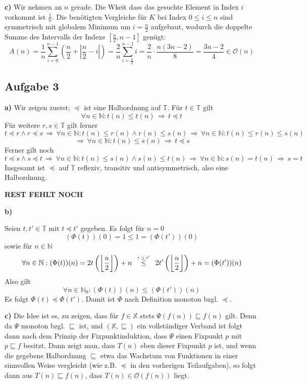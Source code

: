 \documentclass[a4paper,graphics,11pt]{article}
\newcommand{\aufgabe}[1]{\subsection*{Aufgabe #1}}
\newcommand{\up}[2]{\mathrel{\overset{\makebox[0pt]{\mbox{\normalfont\tiny #2}}}{#1}}}
\begin{document}
\textbf{c)} 
Wir nehmen an $n$ gerade. Die Wkeit dass das gesuchte Element in Index $i$ vorkommt ist $\frac{1}{n}$.
Die benötigten Vergleiche für $K$ bei Index $0\leq i \leq n$
sind symmetrisch mit globalem Minimum um $i = \frac{n}{2}$ aufgebaut, wodurch die doppelte Summe des
Intervalls der Indexe $[\frac{n}{2}, n-1]$ genügt:
$$
    A(n)
    = \frac{1}{n} \sum_{i=0}^{n-1}\left( \frac{n}{2} + \left|\frac{n}{2} -i\right|\right)
    = \frac{2}{n} \sum_{i=\frac{n}{2}}^{n-1} i
    = \frac{2}{n} \cdot \frac{n(3n-2)}{8}
    = \frac{3n-2}{4} \in \mathcal{O}(n)
$$

\newpage
\aufgabe{3}
\textbf{a)}
Wir zeigen zuerst; $\preceq$ ist eine Halbordnung auf $\mathbb{T}$.
Für $t \in \mathbb{T}$ gilt
$$
    \forall n \in \mathbb{N} : t(n) \leq t(n) \,\Longrightarrow\, t \preceq t
$$
Für weitere $r,s \in \mathbb{T}$ gilt ferner
$$
    t \preceq r \land r \preceq s
    \,\Longrightarrow\,
    \forall n \in \mathbb{N} : t(n) \leq r(n) \land r(n) \leq s(n)
    \,\Longrightarrow\, \forall n \in \mathbb{N} : t(n) \leq r(n) \leq s(n)
$$$$
    \,\Longrightarrow\, \forall n \in \mathbb{N} : t(n) \leq s(n)
    \,\Longrightarrow\, t \preceq s
$$
Ferner gilt noch
$$
    t \preceq s \land s \preceq t
    \,\Longrightarrow\, \forall n \in\mathbb{N} : t(n) \leq s(n) \land s(n) \leq t(n)
    \,\Longrightarrow\, \forall n \in\mathbb{N} : s(n) = t(n)
    \,\Longrightarrow\, s = t
$$
Insgesamt ist $\preceq$ auf $\mathbb{T}$ reflexiv, transitiv und antisymmetrisch, also eine Halbordnung.

\textbf{REST FEHLT NOCH}

\textbf{b)}

Seien $t, t' \in \mathbb{T}$ mit $t \preceq t'$ gegeben. Es folgt für $n = 0$
$$
    (\Phi(t))(0) = 1 \leq 1 = (\Phi(t'))(0)
$$
sowie für $n \in \mathbb{N}$
$$
    \forall n \in \mathbb{N}: (\Phi(t))(n)
    = 2t\left(\bigg\lfloor\frac{n}{2}\bigg\rfloor\right)+n
    \quad\up{\leq}{$t \preceq t'$}\quad
    2t'\left(\bigg\lfloor\frac{n}{2}\bigg\rfloor\right)+n
    = (\Phi(t'))(n)
$$
Also gilt
$$
    \forall n \in \mathbb{N}_0 : (\Phi(t))(n) \leq (\Phi(t'))(n)
$$
Es folgt $\Phi(t) \preceq \Phi(t')$. Damit ist $\Phi$ nach Definition monoton bzgl. $\preceq$.

\textbf{c)}
Die Idee ist es, zu zeigen, dass für $f \in \mathbb{X}$ stets $\Psi(f(n)) \sqsubseteq f(n)$ gilt.
Denn da $\Psi$ monoton bzgl. $\sqsubseteq$ ist, und $(\mathbb{X}, \sqsubseteq)$ ein vollständiger
Verband ist folgt dann nach dem Prinzip der Fixpunktinduktion, dass $\Psi$ einen Fixpunkt $p$
mit $p \sqsubseteq f$ besitzt. Dann zeigt man, dass $T(n)$ eben dieser Fixpunkt $p$ ist, und
wenn die gegebene Halbordnung $\sqsubseteq$ etwa das Wachstum von Funktionen in einer
sinnvollen Weise vergleicht (wie z.B. $\preceq$ in den vorherigen Teilaufgaben), so
folgt dann aus $T(n) \sqsubseteq f(n)$, dass $T(n) \in \mathcal{O}(f(n))$ liegt.
\end{document}
